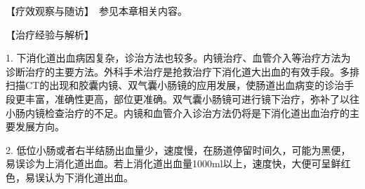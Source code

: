 【疗效观察与随访】　参见本章相关内容。

【治疗经验与解析】

1.
下消化道出血病因复杂，诊治方法也较多。内镜治疗、血管介入等治疗方法为诊断治疗的主要方法。外科手术治疗是抢救治疗下消化道大出血的有效手段。多排扫描CT的出现和胶囊内镜、双气囊小肠镜的应用发展，使肠道出血病变的诊治手段更丰富，准确性更高，部位更准确。双气囊小肠镜可进行镜下治疗，弥补了以往小肠内镜检查治疗的不足。内镜和血管介入诊治方法仍将是下消化道出血治疗的主要发展方向。

2.
低位小肠或者右半结肠出血量少，速度慢，在肠道停留时间久，可能为黑便，易误诊为上消化道出血。若上消化道出血量1000ml以上，速度快，大便可呈鲜红色，易误认为下消化道出血。